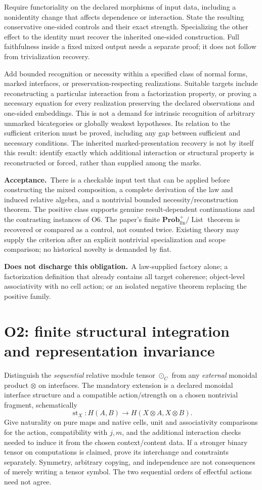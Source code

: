 \documentclass[11pt,a4paper]{article}
\newcommand{\st}{\operatorname{st}}
\newcommand{\Prob}{\mathbf{Prob}^{+}_{\mathrm{fin}}}
\newcommand{\List}{\operatorname{List}}
\newcommand{\accept}{\par\textbf{Acceptance.}\ }
\newcommand{\notaccepted}{\par\textbf{Does not discharge this obligation.}\ }
\begin{document}
Require functoriality on the declared morphisms of input data, including a
nonidentity change that affects dependence or interaction. State the
resulting conservative one-sided controls and their exact strength.
Specializing the other effect to the identity must recover the inherited
one-sided construction. Full faithfulness inside a fixed mixed output needs
a separate proof; it does not follow from trivialization recovery.

Add bounded recognition or necessity within a specified class of normal
forms, marked interfaces, or preservation-respecting realizations. Suitable
targets include reconstructing a particular interaction from a factorization
property, or proving a necessary equation for every realization preserving
the declared observations and one-sided embeddings. This is not a demand
for intrinsic recognition of arbitrary unmarked bicategories or globally
weakest hypotheses. Its relation to the sufficient criterion must be proved,
including any gap between sufficient and necessary conditions.
The inherited marked-presentation recovery is not by itself this result:
identify exactly which additional interaction or structural property is
reconstructed or forced, rather than supplied among the marks.

\accept There is a checkable input test that can be applied before constructing
the mixed composition, a complete derivation of the law and induced
relative algebra, and a nontrivial bounded necessity/reconstruction theorem.
The positive class supports genuine result-dependent continuations and the
contrasting instances of O6. The paper's finite \(\Prob/\List\) theorem is
recovered or compared as a control, not counted twice. Existing theory may
supply the criterion after an explicit nontrivial specialization and scope
comparison; no historical novelty is demanded by fiat.

\notaccepted A law-supplied factory alone; a factorization definition that
already contains all target coherence; object-level associativity with no
cell action; or an isolated negative theorem replacing the positive family.

\section{O2: finite structural integration and representation invariance}\label{sec:o2}

Distinguish the \emph{sequential} relative module tensor \(\odot_C\) from any
\emph{external} monoidal product \(\otimes\) on interfaces. The mandatory
extension is a declared monoidal interface structure and a compatible
action/strength on a chosen nontrivial fragment, schematically
\[
 \st_X:H(A,B)\longrightarrow H(X\otimes A,X\otimes B).
\]
Give naturality on pure maps and native cells, unit and associativity
comparisons for the action, compatibility with \(j,m\), and the additional
interaction checks needed to induce it from the chosen context/content data.
If a stronger binary tensor on computations is claimed, prove its interchange
and constraints separately. Symmetry, arbitrary copying, and independence
are not consequences of merely writing a tensor symbol. The two sequential
orders of effectful actions need not agree.
\end{document}
